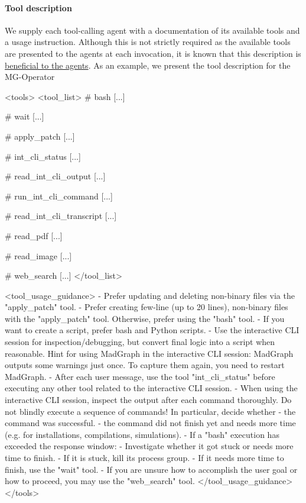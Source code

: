 \documentclass[submission, Phys]{SciPost}
\begin{document}
\paragraph{Tool description}

We supply each tool-calling agent with a documentation of its available tools and a usage instruction. Although this is not strictly required as the available tools are presented to the agents at each invocation, it is known that this description is \href{https://platform.openai.com/docs/guides/function-calling#best-practices-for-defining-functions}{beneficial to the agents}. As an example, we present the tool description for the MG-Operator
%
\begin{promptblocklit}
<tools>
<tool_list>
# bash [...]

# wait [...]

# apply_patch [...]

# int_cli_status [...]

# read_int_cli_output [...]

# run_int_cli_command [...]

# read_int_cli_transcript [...]

# read_pdf [...]

# read_image [...]

# web_search [...]
</tool_list>

<tool_usage_guidance>
- Prefer updating and deleting non-binary files via the "apply_patch" tool.
- Prefer creating few-line (up to 20 lines), non-binary files with the "apply_patch" tool. Otherwise, prefer using the "bash" tool.
- If you want to create a script, prefer bash and Python scripts.
- Use the interactive CLI session for inspection/debugging, but convert final logic into a script when reasonable.
  Hint for using MadGraph in the interactive CLI session: MadGraph outputs some warnings just once. To capture them again, you need to restart MadGraph.
- After each user message, use the tool "int_cli_status" before executing any other tool related to the interactive CLI session.
- When using the interactive CLI session, inspect the output after each command thoroughly. Do not blindly execute a sequence of commands! In particular, decide whether
  - the command was successful.
  - the command did not finish yet and needs more time (e.g. for installations, compilations, simulations).
- If a "bash" execution has exceeded the response window:
  - Investigate whether it got stuck or needs more time to finish.
  - If it is stuck, kill its process group.
  - If it needs more time to finish, use the "wait" tool.
- If you are unsure how to accomplish the user goal or how to proceed, you may use the "web_search" tool.
</tool_usage_guidance>
</tools>
\end{promptblocklit}
\end{document}
